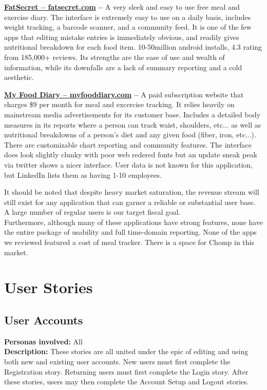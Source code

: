 \documentclass[a4paper,12pt]{article}
\begin{document}
\begin{list}{•}{•}
\item \textbf{\href{http://www.fatsecret.com}{FatSecret -- fatsecret.com} -- }A very sleek and easy to use free meal and exercise diary.  The interface is extremely easy to use on a daily basis, includes weight tracking, a barcode scanner, and a community feed.  It is one of the few apps that editing mistake entries is immediately obvious, and readily gives nutritional breakdown for each food item.  10-50million android installs, 4.3 rating from 185,000+ reviews.  Its strengths are the ease of use and wealth of information, while its downfalls are a lack of summary reporting and a cold aesthetic.
\item \textbf{\href{http://www.myfooddiary.com}{My Food Diary -- myfooddiary.com} -- }A paid subscription website that charges \$9 per month for meal and excercise tracking.  It relies heavily on mainstream media advertisements for its customer base.  Includes a detailed body measures in its reports where a person can track waist, shoulders, etc... as well as nutritional breakdowns of a person's diet and any given food (fiber, iron, etc...).  There are customizable chart reporting and community features. The interface does look slightly clunky with poor web redered fonts but an update sneak peak via twitter shows a nicer interface.  User data is not known for this application, but LinkedIn lists them as having 1-10 employees.
\end{list}
It should be noted that despite heavy market saturation, the revenue stream will still exist for any application that can garner a reliable or substantial user base.  A large number of regular users is our target fiscal goal.\\
Furthermore, although many of these applications have strong features, none have the entire package of usability and full time-domain reporting.  None of the apps we reviewed featured a cost of meal tracker.  There is a space for Chomp in this market.
\section{User Stories}
\subsection{User Accounts}
\textbf{Personas involved:} All\\
\textbf{Description:} These stories are all united under the epic of editing and using both new and existing user accounts.  New users must first complete the Registration story.  Returning users must first complete the Login story.  After these stories, users may then complete the Account Setup and Logout stories.
\end{document}

